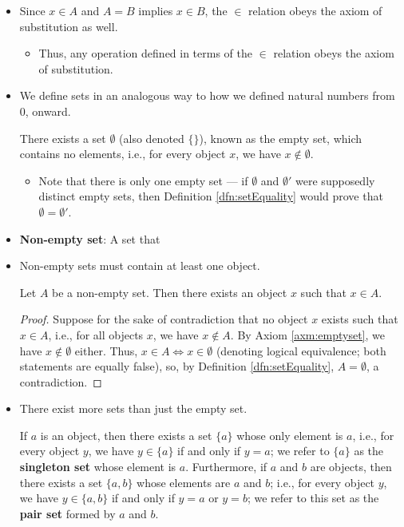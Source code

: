 \documentclass[../main.tex]{subfiles}
\begin{document}
\begin{itemize}
    \item {}Since $x\in A$ and $A=B$ implies $x\in B$, the $\in$ relation obeys the axiom of substitution as well.
    \begin{itemize}
        \item Thus, any operation defined in terms of the $\in$ relation obeys the axiom of substitution.
    \end{itemize}
    \item We define sets in an analogous way to how we defined natural numbers from 0, onward.
    \begin{axm}\label{axm:emptyset}
        There exists a set $\emptyset$ \textup{(}also denoted $\{\}$\textup{)}, known as the empty set, which contains no elements, i.e., for every object $x$, we have $x\notin\emptyset$.
    \end{axm}
    \begin{itemize}
        \item Note that there is only one empty set --- if $\emptyset$ and $\emptyset'$ were supposedly distinct empty sets, then Definition \ref{dfn:setEquality} would prove that $\emptyset=\emptyset'$.
    \end{itemize}
    \item \textbf{Non-empty set}: A set that 
    \item Non-empty sets must contain at least one object.
    \begin{lem}\label{lem:singleChoice}
        Let $A$ be a non-empty set. Then there exists an object $x$ such that $x\in A$.
        \begin{proof}
            Suppose for the sake of contradiction that no object $x$ exists such that $x\in A$, i.e., for all objects $x$, we have $x\notin A$. By Axiom \ref{axm:emptyset}, we have $x\notin\emptyset$ either. Thus, $x\in A \Longleftrightarrow x\in\emptyset$ (denoting logical equivalence; both statements are equally false), so, by Definition \ref{dfn:setEquality}, $A=\emptyset$, a contradiction.
        \end{proof}
    \end{lem}
    \item There exist more sets than just the empty set.
    \begin{axm}\label{axm:singletonPair}
        If $a$ is an object, then there exists a set $\{a\}$ whose only element is $a$, i.e., for every object $y$, we have $y\in\{a\}$ if and only if $y=a$; we refer to $\{a\}$ as the \textbf{singleton set} whose element is $a$. Furthermore, if $a$ and $b$ are objects, then there exists a set $\{a,b\}$ whose elements are $a$ and $b$; i.e., for every object $y$, we have $y\in\{a,b\}$ if and only if $y=a$ or $y=b$; we refer to this set as the \textbf{pair set} formed by $a$ and $b$.

\end{axm}
\end{itemize}
\end{document}
